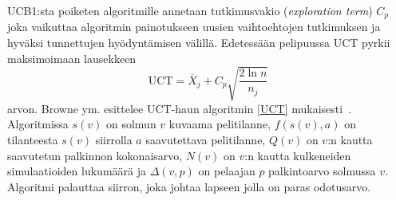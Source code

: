 \documentclass[12pt,finnish]{tktltiki2}
\theoremstyle{definition}
\theoremstyle{remark}
\begin{document}
UCB1:sta poiketen algoritmille annetaan tutkimusvakio (\textit{exploration term}) $C_p$ joka vaikuttaa algoritmin painotukseen uusien vaihtoehtojen tutkimuksen ja hyväksi tunnettujen hyödyntämisen välillä. Edetessään pelipuussa UCT pyrkii maksimoimaan lausekkeen
\begin{equation}
\text{UCT} = \overline{X}_j + C_p \sqrt{\frac{2 \ln n}{n_j}}
\end{equation}
arvon. Browne ym. esittelee UCT-haun algoritmin \ref{UCT} mukaisesti~\cite{browne}. Algoritmissa $s(v)$ on solmun $v$ kuvaama pelitilanne, $f(s(v), a)$ on tilanteesta $s(v)$ siirrolla $a$ saavutettava pelitilanne, $Q(v)$ on $v$:n kautta saavutetun palkinnon kokonaisarvo, $N(v)$ on $v$:n kautta kulkeneiden simulaatioiden lukumäärä ja $\Delta(v, p)$ on pelaajan $p$ palkintoarvo solmussa $v$. Algoritmi palauttaa siirron, joka johtaa lapseen jolla on paras odotusarvo.
\end{document}
